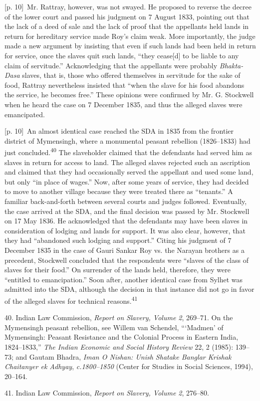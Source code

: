 \documentclass[10pt,a4paper]{article}
\begin{document}
{\scriptsize\color{gray} [p. 10]}\ Mr. Rattray, however, was not swayed. He proposed to reverse the decree of the lower court and passed his judgment on 7 August 1833, pointing out that the lack of a deed of sale and the lack of proof that the appellants held lands in return for hereditary service made Roy’s claim weak. More importantly, the judge made a new argument by insisting that even if such lands had been held in return for service, once the slaves quit such lands, “they cease[d] to be liable to any claim of servitude.” Acknowledging that the appellants were probably \textit{Bhakta-Dasa} slaves, that is, those who offered themselves in servitude for the sake of food, Rattray nevertheless insisted that “when the slave for his food abandons the service, he becomes free.” These opinions were confirmed by Mr. G. Stockwell when he heard the case on 7 December 1835, and thus the alleged slaves were emancipated.\par
{\scriptsize\color{gray} [p. 10]}\ An almost identical case reached the SDA in 1835 from the frontier district of Mymensingh, where a monumental peasant rebellion (1826–1833) had just concluded.\nobreak\textsuperscript{40} The slaveholder claimed that the defendants had served him as slaves in return for access to land. The alleged slaves rejected such an ascription and claimed that they had occasionally served the appellant and used some land, but only “in place of wages.” Now, after some years of service, they had decided to move to another village because they were treated there as “tenants.” A familiar back-and-forth between several courts and judges followed. Eventually, the case arrived at the SDA, and the final decision was passed by Mr. Stockwell on 17 May 1836. He acknowledged that the defendants may have been slaves in consideration of lodging and lands for support. It was also clear, however, that they had “abandoned such lodging and support.” Citing his judgment of 7 December 1835 in the case of Gauri Sankar Roy vs. the Narayan brothers as a precedent, Stockwell concluded that the respondents were “slaves of the class of slaves for their food.” On surrender of the lands held, therefore, they were “entitled to emancipation.” Soon after, another identical case from Sylhet was admitted into the SDA, although the decision in that instance did not go in favor of the alleged slaves for technical reasons.\nobreak\textsuperscript{41}\par{\small 40. Indian Law Commission, \textit{Report on Slavery, Volume 2}, 269–71. On the Mymensingh peasant rebellion, see Willem van Schendel, “‘Madmen’ of Mymensingh: Peasant Resistance and the Colonial Process in Eastern India, 1824–1833,” \textit{The Indian Economic and Social History Review} 22, 2 (1985): 139–73; and Gautam Bhadra, \textit{Iman O Nishan: Unish Shatake Banglar Krishak Chaitanyer ek Adhyay}, \textit{c.1800–1850} (Center for Studies in Social Sciences, 1994), 20–164.\par}{\small 41. Indian Law Commission, \textit{Report on Slavery, Volume 2}, 276–80.\par}
\end{document}
